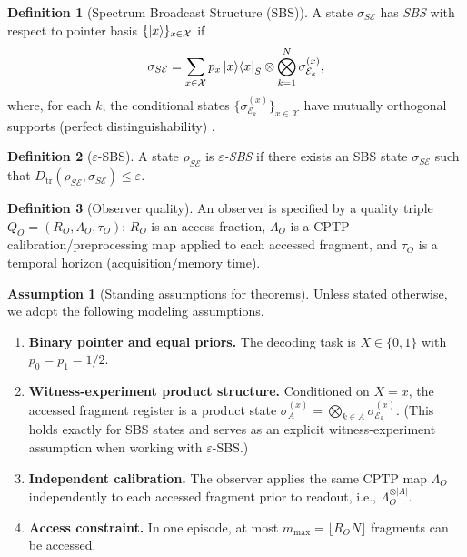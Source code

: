 \documentclass[aps,pra,twocolumn,superscriptaddress,nofootinbib]{revtex4-2}
\newcommand{\cE}{\mathcal{E}}
\newcommand{\cX}{\mathcal{X}}
\newcommand{\Dtr}{D_{\mathrm{tr}}}
\newcommand{\1}{\mathbf{1}}
\theoremstyle{definition}
\newtheorem{definition}{Definition}
\newtheorem{assumption}{Assumption}
\theoremstyle{plain}
\begin{document}
\begin{definition}[Spectrum Broadcast Structure (SBS)]
A state $\sigma_{S\cE}$ has \emph{SBS} with respect to pointer basis $\{\ket{x}\}_{x\in\cX}$ if
\begin{equation}
\sigma_{S\cE}=\sum_{x\in\cX} p_x \ket{x}\!\bra{x}_S \otimes \bigotimes_{k=1}^N \sigma^{(x)}_{\cE_k},
\label{eq:sbs}
\end{equation}
where, for each $k$, the conditional states $\{\sigma^{(x)}_{\cE_k}\}_{x\in\cX}$ have mutually orthogonal supports (perfect distinguishability) \cite{HorodeckiKorbiczHorodecki2015,KorbiczReview2021}.
\end{definition}

\begin{definition}[$\varepsilon$-SBS]
A state $\rho_{S\cE}$ is \emph{$\varepsilon$-SBS} if there exists an SBS state $\sigma_{S\cE}$ such that
$\Dtr(\rho_{S\cE},\sigma_{S\cE})\le\varepsilon$.
\end{definition}

\begin{definition}[Observer quality]
An observer is specified by a quality triple $Q_O=(R_O,\Lambda_O,\tau_O)$:
$R_O$ is an access fraction,
$\Lambda_O$ is a CPTP calibration/preprocessing map applied to each accessed fragment, and
$\tau_O$ is a temporal horizon (acquisition/memory time).
\end{definition}

\begin{assumption}[Standing assumptions for theorems]
\label{assump:standing}
Unless stated otherwise, we adopt the following modeling assumptions.
\begin{enumerate}
\item \textbf{Binary pointer and equal priors.} The decoding task is $X\in\{0,1\}$ with $p_0=p_1=1/2$.
\item \textbf{Witness-experiment product structure.} Conditioned on $X=x$, the accessed fragment register is a product state
$\sigma^{(x)}_{A}=\bigotimes_{k\in A}\sigma^{(x)}_{\cE_k}$.
(This holds exactly for SBS states and serves as an explicit witness-experiment assumption when working with $\varepsilon$-SBS.)
\item \textbf{Independent calibration.} The observer applies the same CPTP map $\Lambda_O$ independently to each accessed fragment prior to readout, i.e., $\Lambda_O^{\otimes |A|}$.
\item \textbf{Access constraint.} In one episode, at most $m_{\max}=\lfloor R_O N\rfloor$ fragments can be accessed.
\end{enumerate}
\end{assumption}
\end{document}
